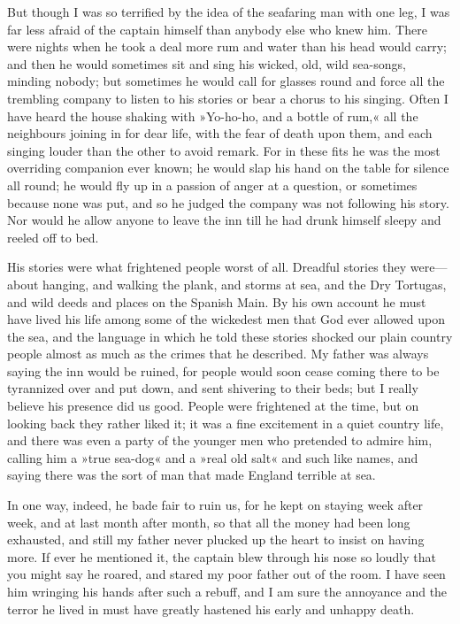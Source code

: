 But though I was so terrified by the idea of the seafaring man with one leg, I was far less afraid of the captain himself than anybody else who knew him. There were nights when he took a deal more rum and water than his head would carry; and then he would sometimes sit and sing his wicked, old, wild sea-songs, minding nobody; but sometimes he would call for glasses round and force all the trembling company to listen to his stories or bear a chorus to his singing. Often I have heard the house shaking with »Yo-ho-ho, and a bottle of rum,« all the neighbours joining in for dear life, with the fear of death upon them, and each singing louder than the other to avoid remark. For in these fits he was the most overriding companion ever known; he would slap his hand on the table for silence all round; he would fly up in a passion of anger at a question, or sometimes because none was put, and so he judged the company was not following his story. Nor would he allow anyone to leave the inn till he had drunk himself sleepy and reeled off to bed.

His stories were what frightened people worst of all. Dreadful stories they were—about hanging, and walking the plank, and storms at sea, and the Dry Tortugas, and wild deeds and places on the Spanish Main. By his own account he must have lived his life among some of the wickedest men that God ever allowed upon the sea, and the language in which he told these stories shocked our plain country people almost as much as the crimes that he described. My father was always saying the inn would be ruined, for people would soon cease coming there to be tyrannized over and put down, and sent shivering to their beds; but I really believe his presence did us good. People were frightened at the time, but on looking back they rather liked it; it was a fine excitement in a quiet country life, and there was even a party of the younger men who pretended to admire him, calling him a »true sea-dog« and a »real old salt« and such like names, and saying there was the sort of man that made England terrible at sea.

In one way, indeed, he bade fair to ruin us, for he kept on staying week after week, and at last month after month, so that all the money had been long exhausted, and still my father never plucked up the heart to insist on having more. If ever he mentioned it, the captain blew through his nose so loudly that you might say he roared, and stared my poor father out of the room. I have seen him wringing his hands after such a rebuff, and I am sure the annoyance and the terror he lived in must have greatly hastened his early and unhappy death.


